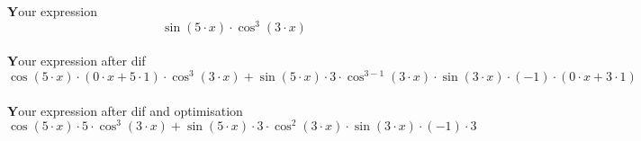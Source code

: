 \documentclass[a4paper, 12pt]{article}
\begin{document}
\maketitle
\textbf


\textbf Your expression
\[\sin({5}\cdot{x})\cdot\cos^{{3}}({3}\cdot{x})\]\\

\textbf Your expression after dif
\[\cos({5}\cdot{x})\cdot({0}\cdot{x} + {5}\cdot{1})\cdot\cos^{{3}}({3}\cdot{x}) + \sin({5}\cdot{x})\cdot{3}\cdot\cos^{{{3} - {1}}}({3}\cdot{x})\cdot\sin({3}\cdot{x})\cdot{(-1)}\cdot({0}\cdot{x} + {3}\cdot{1})\]\\

\textbf Your expression after dif and optimisation
\[\cos({5}\cdot{x})\cdot{5}\cdot\cos^{{3}}({3}\cdot{x}) + \sin({5}\cdot{x})\cdot{3}\cdot\cos^{{2}}({3}\cdot{x})\cdot\sin({3}\cdot{x})\cdot{(-1)}\cdot{3}\]\\
\end{document}
